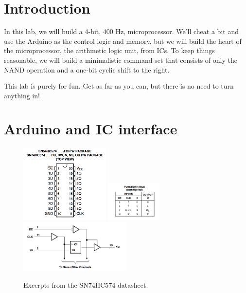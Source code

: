 \documentclass[12pt]{article}
\begin{document}
\section{Introduction}

In this lab, we will build a 4-bit, 400 Hz, microprocessor.  We'll cheat a bit and use the Arduino as the control logic and memory, but we will build the heart of the microprocessor, the arithmetic logic unit, from ICs.  To keep things reasonable, we will build a minimalistic command set that consists of only the NAND operation and a one-bit cyclic shift to the right.

This lab is purely for fun.  Get as far as you can, but there is no need to turn anything in!

\section{Arduino and IC interface}

\begin{figure}[htbp]
\begin{center}
{\includegraphics[width=0.40\textwidth]{figs/SN74HC574_pinout.png}}
{\includegraphics[width=0.25\textwidth]{figs/SN74HC574_table.png}}
{\includegraphics[width=0.50\textwidth]{figs/SN74HC574_diagram.png}}
\end{center}
\caption{\label{fig:hc574} Excerpts from the SN74HC574 datasheet.}
\end{figure}
\end{document}
